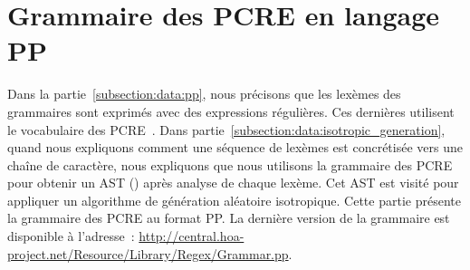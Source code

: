 \section{Grammaire des PCRE en langage PP}
\label{appendices:grammar_of_pcre}

Dans la partie~\ref{subsection:data:pp}, nous précisons que les lexèmes des
grammaires sont exprimés avec des expressions régulières. Ces dernières
utilisent le vocabulaire des PCRE~. Dans
partie~\ref{subsection:data:isotropic_generation}, quand nous expliquons comment
une séquence de lexèmes est concrétisée vers une chaîne de caractère, nous
expliquons que nous utilisons la grammaire des PCRE pour obtenir un AST
() après analyse de chaque lexème. Cet AST est
visité pour appliquer un algorithme de génération aléatoire isotropique. Cette
partie présente la grammaire des PCRE au format PP. La dernière version de la
grammaire est disponible à l'adresse~:
\url{http://central.hoa-project.net/Resource/Library/Regex/Grammar.pp}.

